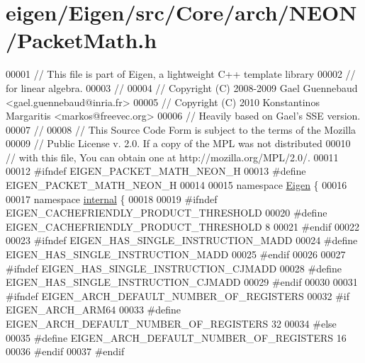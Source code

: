 \hypertarget{eigen_2_eigen_2src_2_core_2arch_2_n_e_o_n_2_packet_math_8h_source}{}\section{eigen/\+Eigen/src/\+Core/arch/\+N\+E\+O\+N/\+Packet\+Math.h}
\label{eigen_2_eigen_2src_2_core_2arch_2_n_e_o_n_2_packet_math_8h_source}

\begin{DoxyCode}
00001 \textcolor{comment}{// This file is part of Eigen, a lightweight C++ template library}
00002 \textcolor{comment}{// for linear algebra.}
00003 \textcolor{comment}{//}
00004 \textcolor{comment}{// Copyright (C) 2008-2009 Gael Guennebaud <gael.guennebaud@inria.fr>}
00005 \textcolor{comment}{// Copyright (C) 2010 Konstantinos Margaritis <markos@freevec.org>}
00006 \textcolor{comment}{// Heavily based on Gael's SSE version.}
00007 \textcolor{comment}{//}
00008 \textcolor{comment}{// This Source Code Form is subject to the terms of the Mozilla}
00009 \textcolor{comment}{// Public License v. 2.0. If a copy of the MPL was not distributed}
00010 \textcolor{comment}{// with this file, You can obtain one at http://mozilla.org/MPL/2.0/.}
00011 
00012 \textcolor{preprocessor}{#ifndef EIGEN\_PACKET\_MATH\_NEON\_H}
00013 \textcolor{preprocessor}{#define EIGEN\_PACKET\_MATH\_NEON\_H}
00014 
00015 \textcolor{keyword}{namespace }\hyperlink{namespace_eigen}{Eigen} \{
00016 
00017 \textcolor{keyword}{namespace }\hyperlink{namespaceinternal}{internal} \{
00018 
00019 \textcolor{preprocessor}{#ifndef EIGEN\_CACHEFRIENDLY\_PRODUCT\_THRESHOLD}
00020 \textcolor{preprocessor}{#define EIGEN\_CACHEFRIENDLY\_PRODUCT\_THRESHOLD 8}
00021 \textcolor{preprocessor}{#endif}
00022 
00023 \textcolor{preprocessor}{#ifndef EIGEN\_HAS\_SINGLE\_INSTRUCTION\_MADD}
00024 \textcolor{preprocessor}{#define EIGEN\_HAS\_SINGLE\_INSTRUCTION\_MADD}
00025 \textcolor{preprocessor}{#endif}
00026 
00027 \textcolor{preprocessor}{#ifndef EIGEN\_HAS\_SINGLE\_INSTRUCTION\_CJMADD}
00028 \textcolor{preprocessor}{#define EIGEN\_HAS\_SINGLE\_INSTRUCTION\_CJMADD}
00029 \textcolor{preprocessor}{#endif}
00030 
00031 \textcolor{preprocessor}{#ifndef EIGEN\_ARCH\_DEFAULT\_NUMBER\_OF\_REGISTERS}
00032 \textcolor{preprocessor}{#if EIGEN\_ARCH\_ARM64}
00033 \textcolor{preprocessor}{#define EIGEN\_ARCH\_DEFAULT\_NUMBER\_OF\_REGISTERS 32}
00034 \textcolor{preprocessor}{#else}
00035 \textcolor{preprocessor}{#define EIGEN\_ARCH\_DEFAULT\_NUMBER\_OF\_REGISTERS 16 }
00036 \textcolor{preprocessor}{#endif}
00037 \textcolor{preprocessor}{#endif}

\end{DoxyCode}
